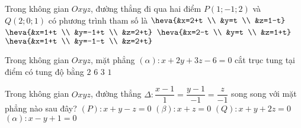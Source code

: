 %

\begin{ex}%
	Trong không gian $Oxyz$, đường thẳng đi qua hai điểm $P(1 ;-1 ; 2)$ và $Q(2 ; 0 ; 1)$ có phương trình tham số là
	\choice
	{\True $\heva{&x=2+t \\ &y=t \\ &z=1-t}$}
	{$\heva{&x=1+t \\ &y=-1+t \\ &z=2+t}$}
	{$\heva{&x=2-t \\ &y=t \\ &z=1+t}$}
	{$\heva{&x=1+t \\ &y=-1-t \\ &z=2+t}$}
\end{ex}

\begin{ex}%
	Trong không gian $Oxyz$, mặt phẳng $(\alpha)\colon x+2y+3z-6=0$ cắt trục tung tại điểm có tung độ bằng
	\choice
	{$2$}
	{$6$}
	{\True $3$}
	{$1$}
\end{ex}


\begin{ex}%
	Trong không gian $Oxyz$, đường thẳng $\Delta\colon \dfrac{x-1}{1}=\dfrac{y-1}{-1}=\dfrac{z}{-1}$ song song với mặt phẳng nào sau đây?
	\choice
	{$(P)\colon x+y-z=0$}
	{\True $(\beta)\colon x+z=0$}
	{$(Q)\colon x+y+2z=0$}
	{$(\alpha)\colon x-y+1=0$}
\end{ex}

